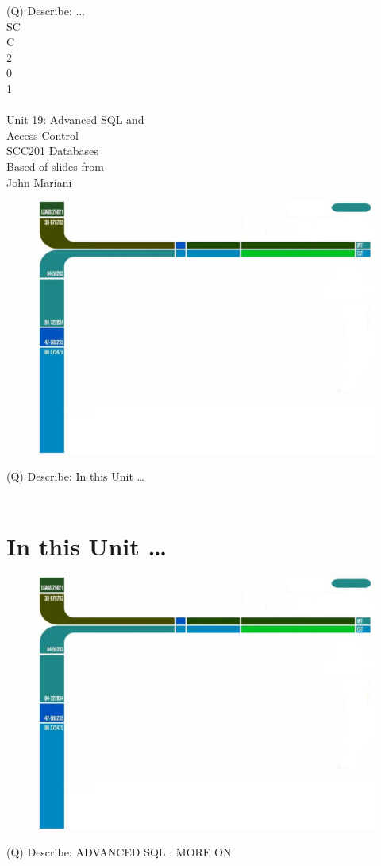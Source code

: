 \documentclass[12pt]{article}
\begin{document}
(Q)
Describe: ...
\\
SC\\
C\\
 2\\
0\\
1\\
 \\
Unit 19: Advanced SQL and \\
Access Control\\
SCC201 Databases\\
Based of slides from\\
John Mariani\\
\begin{figure}[H]
\includegraphics[width=0.5\linewidth]{page1-image-1.png}
\end{figure}
\clearpage
(Q)
Describe: In this Unit …
\\ 
 \\
\section{In this Unit …}
\begin{figure}[H]
\includegraphics[width=0.5\linewidth]{page2-image-1.png}
\end{figure}
\clearpage
(Q)
Describe: ADVANCED SQL : MORE ON 
\\ 
 \\
\end{document}
